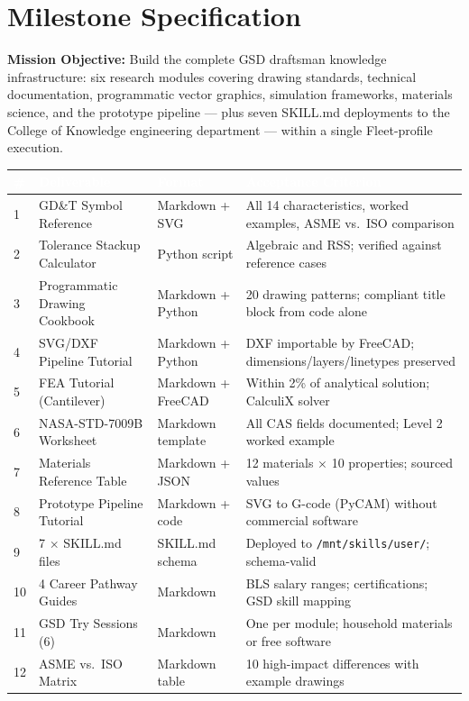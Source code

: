 \documentclass[11pt,letterpaper]{article}
\newcommand{\tableheader}[1]{\textbf{\sffamily\textcolor{white}{#1}}}
\begin{document}
\section{Milestone Specification}

\textbf{Mission Objective:} Build the complete GSD draftsman knowledge infrastructure: six research modules covering drawing standards, technical documentation, programmatic vector graphics, simulation frameworks, materials science, and the prototype pipeline --- plus seven SKILL.md deployments to the College of Knowledge engineering department --- within a single Fleet-profile execution.

\begin{center}
\begin{tabularx}{\textwidth}{C{0.5cm}L{3.5cm}L{3cm}X}
\toprule
{}
\tableheader{\#} & \tableheader{Deliverable} & \tableheader{Format} & \tableheader{Acceptance Criterion} \\
 & GD\&T Symbol Reference & Markdown + SVG & All 14 characteristics, worked examples, ASME vs.\ ISO comparison \\
2 & Tolerance Stackup Calculator & Python script & Algebraic and RSS; verified against reference cases \\
3 & Programmatic Drawing Cookbook & Markdown + Python & 20 drawing patterns; compliant title block from code alone \\
4 & SVG/DXF Pipeline Tutorial & Markdown + Python & DXF importable by FreeCAD; dimensions/layers/linetypes preserved \\
5 & FEA Tutorial (Cantilever) & Markdown + FreeCAD & Within 2\% of analytical solution; CalculiX solver \\
6 & NASA-STD-7009B Worksheet & Markdown template & All CAS fields documented; Level 2 worked example \\
7 & Materials Reference Table & Markdown + JSON & 12 materials $\times$ 10 properties; sourced values \\
8 & Prototype Pipeline Tutorial & Markdown + code & SVG to G-code (PyCAM) without commercial software \\
9 & 7 $\times$ SKILL.md files & SKILL.md schema & Deployed to \texttt{/mnt/skills/user/}; schema-valid \\
10 & 4 Career Pathway Guides & Markdown & BLS salary ranges; certifications; GSD skill mapping \\
11 & GSD Try Sessions (6) & Markdown & One per module; household materials or free software \\
12 & ASME vs.\ ISO Matrix & Markdown table & 10 high-impact differences with example drawings \\
\bottomrule
\end{tabularx}
\end{center}
\end{document}
